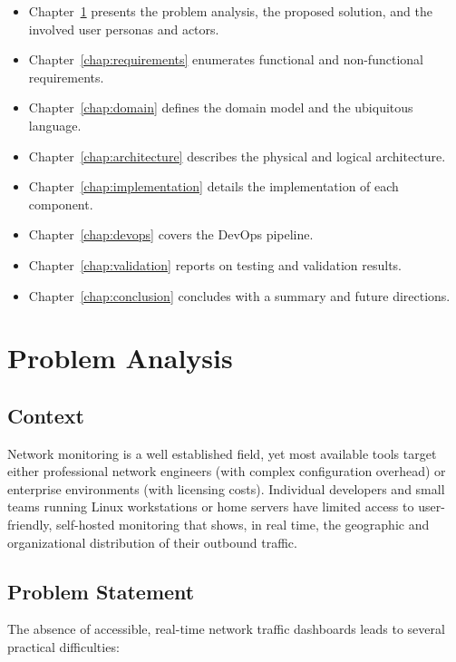 \documentclass[12pt]{report}
\begin{document}
\begin{itemize}
  \item Chapter~\ref{chap:problem} presents the problem analysis, the proposed
    solution, and the involved user personas and actors.
  \item Chapter~\ref{chap:requirements} enumerates functional and non-functional
    requirements.
  \item Chapter~\ref{chap:domain} defines the domain model and the ubiquitous
    language.
  \item Chapter~\ref{chap:architecture} describes the physical and logical
    architecture.
  \item Chapter~\ref{chap:implementation} details the implementation of each
    component.
  \item Chapter~\ref{chap:devops} covers the DevOps pipeline.
  \item Chapter~\ref{chap:validation} reports on testing and validation results.
  \item Chapter~\ref{chap:conclusion} concludes with a summary and future
    directions.
\end{itemize}

\chapter{Problem Analysis}
\label{chap:problem}

\section{Context}

Network monitoring is a well established field, yet most available tools target
either professional network engineers (with complex configuration overhead) or
enterprise environments (with licensing costs). Individual developers and small
teams running Linux workstations or home servers have limited access to
user-friendly, self-hosted monitoring that shows, in real time, the geographic
and organizational distribution of their outbound traffic.

\section{Problem Statement}

The absence of accessible, real-time network traffic dashboards leads to several
practical difficulties:
\end{document}
